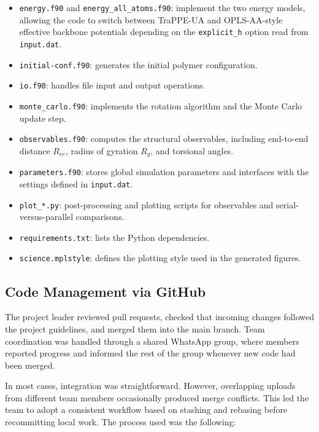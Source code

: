\begin{itemize}
  \item \texttt{energy.f90} and \texttt{energy\_all\_atoms.f90}: implement the two energy models, allowing the code to switch between TraPPE-UA and OPLS-AA-style effective backbone potentials depending on the \texttt{explicit\_h} option read from \texttt{input.dat}.
  \item \texttt{initial-conf.f90}: generates the initial polymer configuration.
  \item \texttt{io.f90}: handles file input and output operations.
  \item \texttt{monte\_carlo.f90}: implements the rotation algorithm and the Monte Carlo update step.
  \item \texttt{observables.f90}: computes the structural observables, including end-to-end distance \(R_{ee}\), radius of gyration \(R_g\), and torsional angles.
  \item \texttt{parameters.f90}: stores global simulation parameters and interfaces with the settings defined in \texttt{input.dat}.
  \item \texttt{plot\_*.py}: post-processing and plotting scripts for observables and serial-versus-parallel comparisons.
  \item \texttt{requirements.txt}: lists the Python dependencies.
  \item \texttt{science.mplstyle}: defines the plotting style used in the generated figures.
\end{itemize}

\subsection{Code Management via GitHub}\label{code-management-via-github}

The project leader reviewed pull requests, checked that incoming changes followed the project guidelines, and merged them into the main branch. Team coordination was handled through a shared WhatsApp group, where members reported progress and informed the rest of the group whenever new code had been merged.

In most cases, integration was straightforward. However, overlapping uploads from different team members occasionally produced merge conflicts. This led the team to adopt a consistent workflow based on stashing and rebasing before recommitting local work. The process used was the following:

